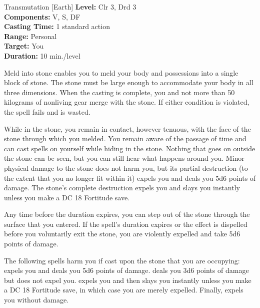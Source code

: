 {Transmutation [Earth]}
{
	\textbf{Level:}
	Clr 3, Drd 3\\
	\textbf{Components:}
	V, S, DF\\
	\textbf{Casting Time:}
	1 standard action\\
	\textbf{Range:}
	Personal\\
	\textbf{Target:}
	You\\
	\textbf{Duration:}
	10 min./level\\
}
{
	Meld into stone enables you to meld your body and possessions into a single block of stone. The stone must be large enough to accommodate your body in all three dimensions. When the casting is complete, you and not more than 50 kilograms of nonliving gear merge with the stone. If either condition is violated, the spell fails and is wasted.

	While in the stone, you remain in contact, however tenuous, with the face of the stone through which you melded. You remain aware of the passage of time and can cast spells on yourself while hiding in the stone. Nothing that goes on outside the stone can be seen, but you can still hear what happens around you. Minor physical damage to the stone does not harm you, but its partial destruction (to the extent that you no longer fit within it) expels you and deals you 5d6 points of damage. The stone's complete destruction expels you and slays you instantly unless you make a DC 18 Fortitude save.

	Any time before the duration expires, you can step out of the stone through the surface that you entered. If the spell's duration expires or the effect is dispelled before you voluntarily exit the stone, you are violently expelled and take 5d6 points of damage.

	The following spells harm you if cast upon the stone that you are occupying:  expels you and deals you 5d6 points of damage.  deals you 3d6 points of damage but does not expel you.  expels you and then slays you instantly unless you make a DC 18 Fortitude save, in which case you are merely expelled. Finally,  expels you without damage.

}
